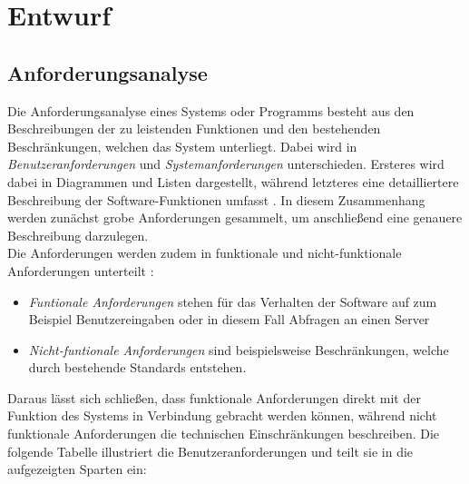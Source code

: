 \chapter{Entwurf} \label{chp:design}

\section{Anforderungsanalyse} \label{sec:requirements} Die Anforderungsanalyse 
eines Systems oder Programms besteht aus den Beschreibungen der zu leistenden Funktionen und 
den bestehenden Beschränkungen, welchen das System unterliegt.
Dabei wird in \textit{Benutzeranforderungen} und \textit{Systemanforderungen} unterschieden. 
Ersteres wird dabei in Diagrammen und Listen dargestellt, während letzteres eine detailliertere Beschreibung der Software-Funktionen umfasst \cite{Sommerville.2016}. In diesem Zusammenhang werden zunächst grobe Anforderungen gesammelt, um anschließend eine genauere Beschreibung darzulegen. \\
Die Anforderungen werden zudem in funktionale und nicht-funktionale Anforderungen unterteilt \cite{Sommerville.2016}:

\begin{itemize}
    \item \textit{Funtionale Anforderungen} stehen für das Verhalten der Software auf zum Beispiel Benutzereingaben oder in diesem Fall Abfragen an einen Server 
    \item \textit{Nicht-funtionale Anforderungen} sind beispielsweise Beschränkungen, welche durch bestehende Standards entstehen. 
\end{itemize}

Daraus lässt sich schließen, dass funktionale Anforderungen direkt mit der Funktion des Systems in Verbindung gebracht werden können, während nicht funktionale Anforderungen die technischen Einschränkungen beschreiben. Die folgende Tabelle illustriert die Benutzeranforderungen und teilt sie in die aufgezeigten Sparten ein:

